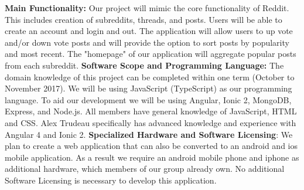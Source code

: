 \documentclass[12pt,fleqn]{article}
\begin{document}
\textbf{Main Functionality: } Our project will mimic the core functionality of Reddit.  This includes creation of subreddits, threads, and posts.   Users will be able to create an account and login and out.  The application will allow users to up vote and/or down vote posts and will provide the option to sort posts by popularity and most recent.  The "homepage" of our application will aggregate popular posts from each subreddit.  
 \newline  \newline
\textbf{Software Scope and Programming Language: }  The domain knowledge of this project can be completed within one term (October to November 2017).  We will be using JavaScript (TypeScript) as our programming language.  To aid our development we will be using Angular, Ionic 2, MongoDB, Express, and Node.js.  All members have general knowledge of JavaScript, HTML and CSS.  Alex Trudeau specifically has advanced knowledge and experience with Angular 4 and Ionic 2.
 \newline  \newline
\textbf{Specialized Hardware and Software Licensing}:  We plan to create a web application that can also be converted to an android and ios mobile application.  As a result we require an android mobile phone and iphone as additional hardware, which members of our group already own.  No additional Software Licensing is necessary to develop this application.
\end{document}
